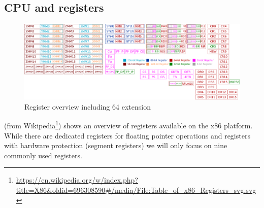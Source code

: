 \documentclass[article]{uibk}
\begin{document}
\subsection{CPU and registers}

\begin{figure}[htpb]
    \centering
    \includegraphics[width=\textwidth]{gfx/x86_registers.pdf}
    \caption{Register overview including \SI{64}{\bit} extension}
    \label{fig:registers}
\end{figure}

 (from
Wikipedia\footnote{\url{https://en.wikipedia.org/w/index.php?title=X86&oldid=696308590\#/media/File:Table_of_x86_Registers_svg.svg}})
shows an overview of registers available on the x86 platform. While there are
dedicated registers for floating pointer operations and registers with hardware
protection (segment registers) we will only focus on nine commonly used
registers.
\end{document}
